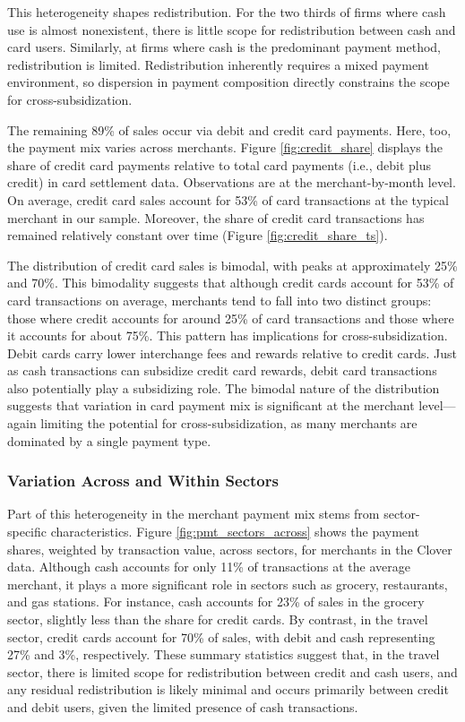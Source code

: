 \documentclass[main.tex]{subfiles}
\begin{document}
This heterogeneity shapes redistribution.
For the two thirds of firms where cash use is almost nonexistent, there is little scope for redistribution between cash and card users.
Similarly, at firms where cash is the predominant payment method, redistribution is limited.
Redistribution inherently requires a mixed payment environment, so dispersion in payment composition directly constrains the scope for cross-subsidization.

The remaining 89\% of sales occur via debit and credit card payments.
Here, too, the payment mix varies across merchants.
Figure \ref{fig:credit_share} displays the share of credit card payments relative to total card payments (i.e., debit plus credit) in card settlement data.
Observations are at the merchant-by-month level.
On average, credit card sales account for 53\% of card transactions at the typical merchant in our sample.
Moreover, the share of credit card transactions has remained relatively constant over time (Figure \ref{fig:credit_share_ts}).

The distribution of credit card sales is bimodal, with peaks at approximately 25\% and 70\%.
This bimodality suggests that although credit cards account for 53\% of card transactions on average, merchants tend to fall into two distinct groups: those where credit accounts for around 25\% of card transactions and those where it accounts for about 75\%.
This pattern has implications for cross-subsidization.
Debit cards carry lower interchange fees and rewards relative to credit cards.
Just as cash transactions can subsidize credit card rewards, debit card transactions also potentially play a subsidizing role.
The bimodal nature of the distribution suggests that variation in card payment mix is significant at the merchant level---again limiting the potential for cross-subsidization, as many merchants are dominated by a single payment type.

\subsubsection{Variation Across and Within Sectors}

Part of this heterogeneity in the merchant payment mix stems from sector-specific characteristics.
Figure \ref{fig:pmt_sectors_across} shows the payment shares, weighted by transaction value, across sectors, for merchants in the Clover data.
Although cash accounts for only 11\% of transactions at the average merchant, it plays a more significant role in sectors such as grocery, restaurants, and gas stations.
For instance, cash accounts for 23\% of sales in the grocery sector, slightly less than the share for credit cards.
By contrast, in the travel sector, credit cards account for 70\% of sales, with debit and cash representing 27\% and 3\%, respectively.
These summary statistics suggest that, in the travel sector, there is limited scope for redistribution between credit and cash users, and any residual redistribution is likely minimal and occurs primarily between credit and debit users, given the limited presence of cash transactions.
\end{document}
